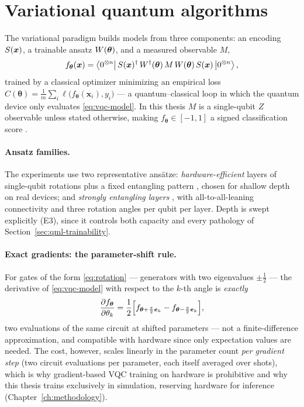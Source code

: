 \section{Variational quantum algorithms}
\label{sec:qml-vqa}

The variational paradigm \citep{cerezo2021vqa} builds models from three
components: an encoding $S(\bm{x})$, a trainable ansatz $W(\bm{\theta})$, and a
measured observable $M$,
\begin{equation}
  f_{\bm{\theta}}(\bm{x})
  = \left\langle0^{\otimes n}\right| S(\bm{x})^{\dagger}\, W^{\dagger}(\bm{\theta})\,
    M\, W(\bm{\theta})\, S(\bm{x}) \left|0^{\otimes n}\right\rangle,
  \label{eq:vqc-model}
\end{equation}
trained by a classical optimizer minimizing an empirical loss
$C(\bm{\theta}) = \tfrac{1}{m} \sum_i \ell\bigl( f_{\bm{\theta}}(\bm{x}_i),
y_i \bigr)$ --- a quantum--classical loop in which the quantum device only
evaluates \eqref{eq:vqc-model}. In this thesis $M$ is a single-qubit
$Z$ observable unless stated otherwise, making
$f_{\bm{\theta}} \in [-1, 1]$ a signed classification score
\citep{mitarai2018qcl, farhi2018qnn, schuld2020circuitcentric}.

\paragraph{Ansatz families.} The experiments use two representative ansätze:
\emph{hardware-efficient} layers of single-qubit rotations plus a fixed
entangling pattern \citep{kandala2017hardware}, chosen for shallow depth on
real devices; and \emph{strongly entangling layers}
\citep{schuld2020circuitcentric}, with all-to-all-leaning connectivity and
three rotation angles per qubit per layer. Depth is swept explicitly (E3),
since it controls both capacity and every pathology of
Section~\ref{sec:qml-trainability}.

\paragraph{Exact gradients: the parameter-shift rule.}
For gates of the form \eqref{eq:rotation} --- generators with two eigenvalues
$\pm\tfrac{1}{2}$ --- the derivative of \eqref{eq:vqc-model} with respect to
the $k$-th angle is \emph{exactly}
\begin{equation}
  \frac{\partial f_{\bm{\theta}}}{\partial \theta_k}
  = \frac{1}{2} \Bigl[
      f_{\bm{\theta} + \frac{\pi}{2} \bm{e}_k}
    - f_{\bm{\theta} - \frac{\pi}{2} \bm{e}_k}
    \Bigr],
  \label{eq:parameter-shift}
\end{equation}
two evaluations of the same circuit at shifted parameters
\citep{mitarai2018qcl, schuld2021fourier} --- not a finite-difference
approximation, and compatible with hardware since only expectation values are
needed. The cost, however, scales linearly in the parameter count \emph{per
gradient step} (two circuit evaluations per parameter, each itself averaged
over shots), which is why gradient-based VQC training on hardware is
prohibitive and why this thesis trains exclusively in simulation, reserving
hardware for inference (Chapter~\ref{ch:methodology}).


